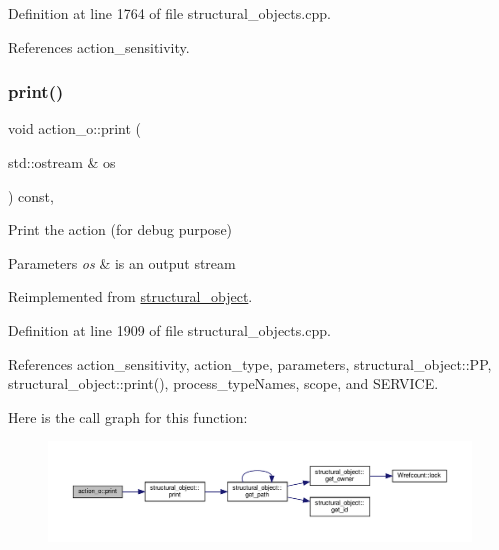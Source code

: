 Definition at line 1764 of file structural\+\_\+objects.\+cpp.



References action\+\_\+sensitivity.

\mbox{\label{classaction__o_ab40aedb1cdbac2ac73d613b1036e4b43}} 
\subsubsection{\texorpdfstring{print()}{print()}}
{\footnotesize\ttfamily void action\+\_\+o\+::print (\begin{DoxyParamCaption}\item[{std\+::ostream \&}]{os }\end{DoxyParamCaption}) const\hspace{0.3cm}{\ttfamily [override]}, {\ttfamily [virtual]}}



Print the action (for debug purpose) 


\begin{DoxyParams}{Parameters}
{\em os} & is an output stream \\
\hline
\end{DoxyParams}


Reimplemented from \hyperlink{classstructural__object_a6770e169cf00f814a35b2939ec8f92eb}{structural\+\_\+object}.



Definition at line 1909 of file structural\+\_\+objects.\+cpp.



References action\+\_\+sensitivity, action\+\_\+type, parameters, structural\+\_\+object\+::\+PP, structural\+\_\+object\+::print(), process\+\_\+type\+Names, scope, and S\+E\+R\+V\+I\+CE.

Here is the call graph for this function\+:
\nopagebreak
\begin{figure}[H]
\begin{center}
\leavevmode
\includegraphics[width=350pt]{d2/ded/classaction__o_ab40aedb1cdbac2ac73d613b1036e4b43_cgraph}
\end{center}
\end{figure}
\mbox{\label{classaction__o_af5e89b242d1180d219eea85b3c49b4a1}} 
